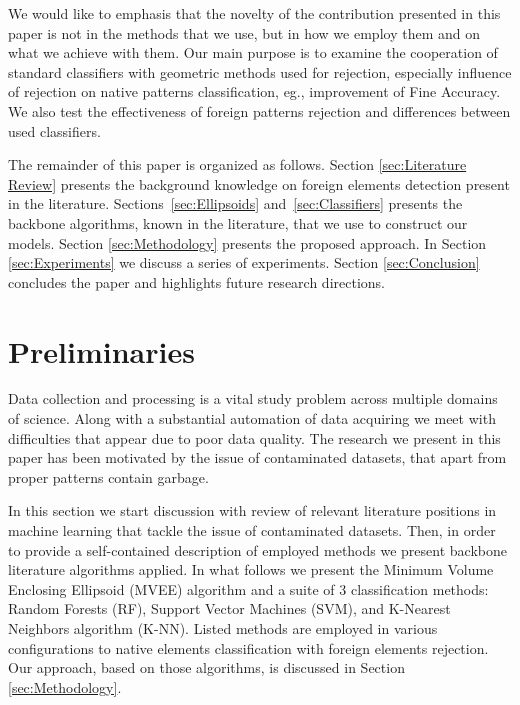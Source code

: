 \documentclass{llncs}
\begin{document}
We would like to emphasis that the novelty of the contribution presented in this paper is not in the methods that we use, but in how we employ them and on what we achieve with them. Our main purpose is to examine the cooperation of standard classifiers with geometric methods used for rejection, especially influence of rejection on native patterns classification, eg., improvement of Fine Accuracy. We also test the effectiveness of foreign patterns rejection and differences between used classifiers. %

The remainder of this paper is organized as follows. Section \ref{sec:Literature Review} presents the background knowledge on foreign elements detection present in the literature. Sections~\ref{sec:Ellipsoids} and~\ref{sec:Classifiers} presents the backbone algorithms, known in the literature, that we use to construct our models. Section \ref{sec:Methodology} presents the proposed approach. In Section \ref{sec:Experiments} we discuss a series of experiments. %
Section \ref{sec:Conclusion} concludes the paper and highlights future research directions.


\vspace{-3pt}
\section{Preliminaries}
  \label{sec:Preliminaries}
\vspace{-6pt}

Data collection and processing is a vital study problem across multiple domains of science. Along with a substantial automation of data acquiring we meet with difficulties that appear due to poor data quality. The research we present in this paper has been motivated by the issue of contaminated datasets, that apart from proper patterns contain garbage.

In this section we start discussion with review of relevant literature positions in machine learning that tackle the issue of contaminated datasets. Then, in order to provide a self-contained description of employed methods we present backbone literature algorithms applied. In what follows we present the Minimum Volume Enclosing Ellipsoid (MVEE) algorithm and a suite of 3 classification methods: Random Forests (RF), Support Vector Machines (SVM), and K-Nearest Neighbors algorithm (K-NN). Listed methods are employed in various configurations to native elements classification with foreign elements rejection. Our approach, based on those algorithms, is discussed in Section \ref{sec:Methodology}.
\end{document}
